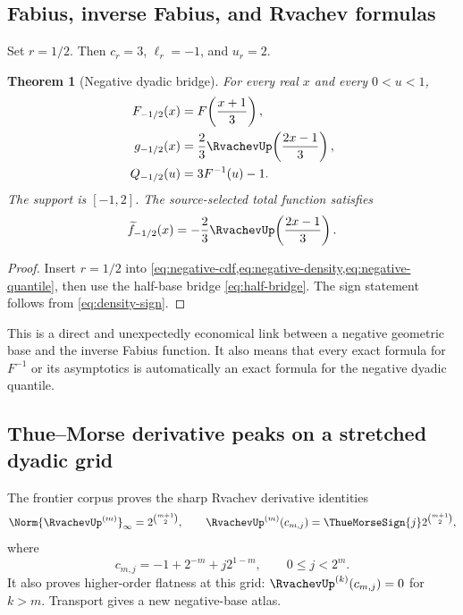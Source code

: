 \documentclass[11pt]{article}
\newtheorem{theorem}{Theorem}[section]
\theoremstyle{definition}
\begin{document}
\subsection{Fabius, inverse Fabius, and Rvachev formulas}

Set \(r=1/2\).  Then \(c_r=3\), \(\ell_r=-1\), and \(u_r=2\).

\begin{theorem}[Negative dyadic bridge]\label{thm:negative-dyadic}
For every real \(x\) and every \(0<u<1\),
\begin{align}
 F_{-1/2}(x)&=F\!\left(\frac{x+1}{3}\right),              \label{eq:negative-dyadic-cdf}\\
 g_{-1/2}(x)&=\frac23\RvachevUp\!\left(\frac{2x-1}{3}\right),  \label{eq:negative-dyadic-density}\\
 Q_{-1/2}(u)&=3F^{-1}(u)-1.                               \label{eq:negative-dyadic-quantile}
\end{align}
The support is \([-1,2]\).  The source-selected total function satisfies
\begin{equation}
 \widetilde f_{-1/2}(x)=-\frac23\RvachevUp\!\left(\frac{2x-1}{3}\right). \label{eq:negative-dyadic-selected}
\end{equation}
\end{theorem}

\begin{proof}
Insert \(r=1/2\) into \cref{eq:negative-cdf,eq:negative-density,eq:negative-quantile},
then use the half-base bridge \cref{eq:half-bridge}.  The sign statement follows from
\cref{eq:density-sign}.
\end{proof}

This is a direct and unexpectedly economical link between a negative geometric base and
the inverse Fabius function.  It also means that every exact formula for \(F^{-1}\) or
its asymptotics is automatically an exact formula for the negative dyadic quantile.

\subsection{Thue--Morse derivative peaks on a stretched dyadic grid}

The frontier corpus proves the sharp Rvachev derivative identities
\begin{equation}
 \Norm{\RvachevUp^{(m)}}_\infty=2^{\binom{m+1}{2}},
 \qquad
 \RvachevUp^{(m)}(c_{m,j})=\ThueMorseSign{j}2^{\binom{m+1}{2}},       \label{eq:up-peaks-baseline}
\end{equation}
where
\begin{equation}
 c_{m,j}=-1+2^{-m}+j2^{1-m},
 \qquad 0\le j<2^m.                                      \label{eq:cmj}
\end{equation}
It also proves higher-order flatness at this grid: \(\RvachevUp^{(k)}(c_{m,j})=0\) for
\(k>m\).  Transport gives a new negative-base atlas.
\end{document}
